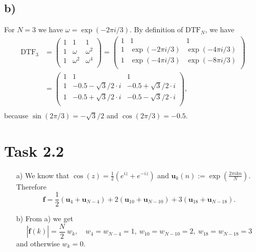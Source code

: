 \documentclass[12pt]{article}
\begin{document}
\subsection*{b)}
For $N = 3$ we have $\omega = \exp(-2\pi i/3)$. By definition of $\text{DTF}_{N}$, we have
\begin{align*}
\text{DTF}_{3} &= \left( \begin{array}{rrr}1 & 1 & 1 \\1 & \omega & \omega^{2} \\1 & \omega^{2} & \omega^{4}\\\end{array}\right) =
\left( \begin{array}{rrr}1 & 1 & 1 \\1 & \exp(-2\pi i/3) & \exp(-4\pi i/3) \\1 & \exp(-4\pi i/3) & \exp(-8\pi i/3)\\\end{array}\right)\\
&= \left( \begin{array}{rrr}1 & 1 & 1 \\1 & -0.5-\sqrt{3}/2\cdot i & -0.5+\sqrt{3}/2\cdot i \\1 & -0.5+\sqrt{3}/2\cdot i & -0.5-\sqrt{3}/2\cdot i\\\end{array}\right),\\
\end{align*}
because $\sin(2\pi/3) = -\sqrt{3}/2$ and $\cos(2\pi/3) = -0.5$.

\section*{Task 2.2}
\begin{itemize}
    \item [a)] We know that $\cos(z)=\frac{1}{2}(e^{iz}+e^{-iz})$ and $\pmb{u}_k(n) := \exp(\frac{2\pi ikn}{N})$. Therefore
    \[\pmb{f}=\frac{1}{2}(\pmb{u}_4+\pmb{u}_{N-4})+2(\pmb{u}_{10}+\pmb{u}_{N-10})+3(\pmb{u}_{18}+\pmb{u}_{N-18}).\]
    \item [b)] From a) we get
    \[\left\lvert \hat{\pmb{f}}(k) \right\rvert = \frac{N}{2}\: w_k, \quad w_4=w_{N-4}=1,\: w_{10}=w_{N-10}=2,\: w_{18}=w_{N-18}=3\]
    and otherwise $w_k = 0$.
\end{itemize}
\end{document}
